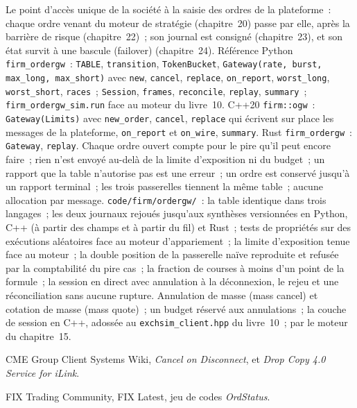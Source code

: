 \begin{build}
 Le point d'accès unique de la société à la saisie des ordres de la plateforme~: chaque ordre venant du moteur de stratégie (chapitre~20) passe
par elle, après la barrière de risque (chapitre~22)~; son journal est consigné (chapitre~23), et son état survit à une bascule (failover)
(chapitre~24).
 Référence Python \texttt{firm\_ordergw}~: \texttt{TABLE}, \texttt{transition}, \texttt{TokenBucket},
\texttt{Gateway(rate, burst, max\_long, max\_short)} avec \texttt{new}, \texttt{cancel}, \texttt{replace}, \texttt{on\_report},
\texttt{worst\_long}, \texttt{worst\_short}, \texttt{races}~; \texttt{Session}, \texttt{frames}, \texttt{reconcile},
\texttt{replay}, \texttt{summary}~; \texttt{firm\_ordergw\_sim.run} face au moteur du livre~10. C++20 \texttt{firm::ogw}~:
\texttt{Gateway(Limits)} avec \texttt{new\_order}, \texttt{cancel}, \texttt{replace} qui écrivent sur place les messages de la plateforme,
\texttt{on\_report} et \texttt{on\_wire}, \texttt{summary}. Rust \texttt{firm\_ordergw}~: \texttt{Gateway}, \texttt{replay}.
 Chaque ordre ouvert compte pour le pire qu'il peut encore faire~; rien n'est envoyé au-delà de la limite d'exposition ni du budget~;
un rapport que la table n'autorise pas est une erreur~; un ordre est conservé jusqu'à un rapport terminal~; les trois passerelles tiennent la même
table~; aucune allocation par message.
 \texttt{code/firm/ordergw/}~: la table identique dans trois langages~; les deux journaux rejoués jusqu'aux
synthèses versionnées en Python, C++ (à partir des champs et à partir du fil) et Rust~; tests de propriétés sur des exécutions aléatoires face au
moteur d'appariement~; la limite d'exposition tenue face au moteur~; la double position de la passerelle naïve reproduite et refusée par
la comptabilité du pire cas~; la fraction de courses à moins d'un point de la formule~; la session en direct avec annulation à la déconnexion, le rejeu
et une réconciliation sans aucune rupture.
 Annulation de masse (mass cancel) et cotation de masse (mass quote)~; un budget réservé aux annulations~; la couche de session en C++, adossée au
\texttt{exchsim\_client.hpp} du livre~10~;  par le moteur du chapitre~15.
\end{build}

\begin{omsources}
\item CME Group Client Systems Wiki, \emph{Cancel on Disconnect}, et \emph{Drop Copy 4.0 Service for iLink}.
\item FIX Trading Community, FIX Latest, jeu de codes \emph{OrdStatus}.
\end{omsources}


